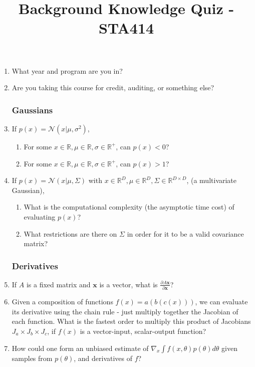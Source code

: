 \documentclass[12pt]{article}
\title{\vspace{-4ex}Background Knowledge Quiz - STA414}
\date{\vspace{-4ex}}
\newcommand{\vx}{{\mathbf{x}}}
\begin{document}

\maketitle

\begin{enumerate}
\item What year and program are you in?
\item Are you taking this course for credit, auditing, or something else?
\subsubsection*{Gaussians}
\item If $p(x) = \mathcal{N}(x | \mu, \sigma^2)$,
\begin{enumerate}
\item For some $x \in \mathbb{R}, \mu \in \mathbb{R}, \sigma \in \mathbb{R}^+$, can $p(x) < 0$?
\item For some $x \in \mathbb{R}, \mu \in \mathbb{R}, \sigma \in \mathbb{R}^+$, can $p(x) > 1$?
\end{enumerate}
\item If $p(x) = \mathcal{N}(x | \mu, \Sigma)$ with $x \in \mathbb{R}^D, \mu \in \mathbb{R}^D, \Sigma \in \mathbb{R}^{D\times D}$, (a multivariate Gaussian),
\begin{enumerate}
\item What is the computational complexity (the asymptotic time cost) of evaluating $p(x)$?
\item What restrictions are there on $\Sigma$ in order for it to be a valid covariance matrix?
\end{enumerate}
\subsubsection*{Derivatives}
\item If $A$ is a fixed matrix and $\vx$ is a vector, what is $\frac{\partial A \vx}{\partial \vx}$?
\item Given a composition of functions $f(x) = a(b(c(x)))$, we can evaluate its derivative using the chain rule - just multiply together the Jacobian of each function.
What is the fastest order to multiply this product of Jacobians $J_a \times J_b \times J_c$, if $f(x)$ is a vector-input, scalar-output function?\vspace{0.5cm}
\item How could one form an unbiased estimate of $\nabla_x \int f(x, \theta) p(\theta) d\theta$ given samples from $p(\theta)$, and derivatives of $f$?

\end{enumerate}
\end{document}
